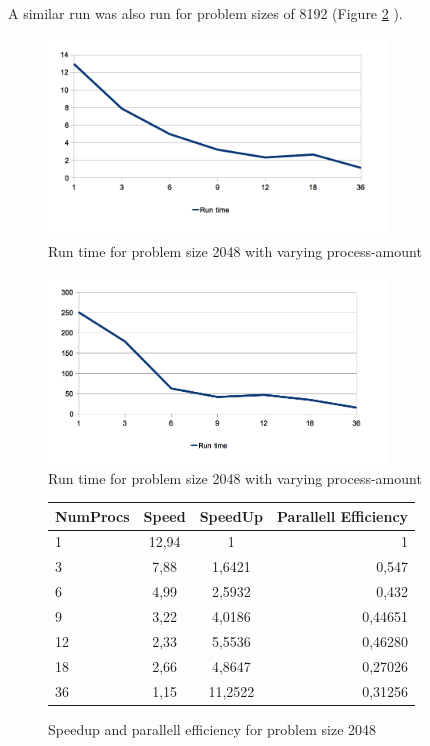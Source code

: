 A similar run was also run for problem sizes of 8192 (Figure \ref{numprocs8192} ).

\begin{figure}[H]
  \centering
    \includegraphics[width=0.8\textwidth]{RunTimePerProcess2048.png}
    \caption{Run time for problem size 2048 with varying process-amount}
    \label{numprocs2048}
\end{figure}

\begin{figure}[t]
  \centering
    \includegraphics[width=0.8\textwidth]{RunTimePerProcess8192.png}
    \caption{Run time for problem size 2048 with varying process-amount}
    \label{numprocs8192}
\end{figure}

\begin{figure}[ht]
    \begin{tabular}{l | c | c | r}
        NumProcs & Speed & SpeedUp & Parallell Efficiency \\
        \hline
        1 & 12,94 & 1 & 1 \\
        3 & 7,88 & 1,6421 & 0,547 \\
        6 & 4,99 & 2,5932 & 0,432 \\
        9 & 3,22 & 4,0186 & 0,44651 \\
        12 & 2,33 & 5,5536 & 0,46280 \\
        18 & 2,66 & 4,8647 & 0,27026 \\
        36 & 1,15 & 11,2522 & 0,31256 \\
        \hline
    \end{tabular}
    \caption{Speedup and parallell efficiency for problem size 2048}
\end{figure}

